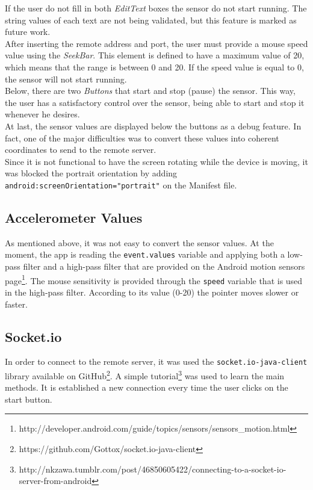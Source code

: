 \documentclass{llncs}
\begin{document}
\noindent If the user do not fill in both \textit{EditText} boxes the sensor do not start running. The string values of each text are not being validated, but this feature is marked as future work.
\\

\noindent After inserting the remote address and port, the user must provide a mouse speed value using the \textit{SeekBar}. This element is defined to have a maximum value of 20, which means that the range is between 0 and 20. If the speed value is equal to 0, the sensor will not start running.
\\

\noindent Below, there are two \textit{Buttons} that start and stop (pause) the sensor. This way, the user has a satisfactory control over the sensor, being able to start and stop it whenever he desires.
\\

\noindent At last, the sensor values are displayed below the buttons as a debug feature. In fact, one of the major difficulties was to convert these values into coherent coordinates to send to the remote server.
\\

\noindent Since it is not functional to have the screen rotating while the device is moving, it was blocked the portrait orientation by adding \texttt{android:screenOrientation="portrait"} on the Manifest file.

\subsection{Accelerometer Values}

As mentioned above, it was not easy to convert the sensor values. At the moment, the app is reading the \texttt{event.values} variable and applying both a low-pass filter and a high-pass filter that are provided on the Android motion sensors page\footnote{http://developer.android.com/guide/topics/sensors/sensors\_motion.html}. The mouse sensitivity is provided through the \texttt{speed} variable that is used in the high-pass filter. According to its value (0-20) the pointer moves slower or faster.

\subsection{Socket.io}

In order to connect to the remote server, it was used the \texttt{socket.io-java-client} library available on GitHub\footnote{https://github.com/Gottox/socket.io-java-client}. A simple tutorial\footnote{http://nkzawa.tumblr.com/post/46850605422/connecting-to-a-socket-io-server-from-android} was used to learn the main methods. It is established a new connection every time the user clicks on the start button.
\end{document}
